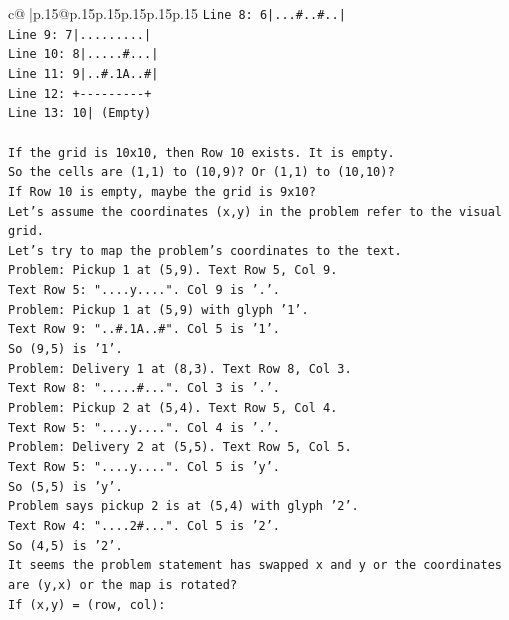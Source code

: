 \documentclass{article}
\begin{document}
{\begin{supertabular}{c@{$\;$}|p{.15\linewidth}@{}p{.15\linewidth}p{.15\linewidth}p{.15\linewidth}p{.15\linewidth}p{.15\linewidth}}
{{{\texttt{Line 8: 6|...\#..\#..|} \\
\texttt{Line 9: 7|.........|} \\
\texttt{Line 10: 8|.....\#...|} \\
\texttt{Line 11: 9|..\#.1A..\#|} \\
\texttt{Line 12: +{-}{-}{-}{-}{-}{-}{-}{-}{-}+} \\
\texttt{Line 13: 10| (Empty)} \\
\\ 
\texttt{If the grid is 10x10, then Row 10 exists. It is empty.} \\
\texttt{So the cells are (1,1) to (10,9)? Or (1,1) to (10,10)?} \\
\texttt{If Row 10 is empty, maybe the grid is 9x10?} \\
\texttt{Let's assume the coordinates (x,y) in the problem refer to the visual grid.} \\
\texttt{Let's try to map the problem's coordinates to the text.} \\
\texttt{Problem: Pickup 1 at (5,9). Text Row 5, Col 9.} \\
\texttt{Text Row 5: "....y....". Col 9 is '.'.} \\
\texttt{Problem: Pickup 1 at (5,9) with glyph '1'.} \\
\texttt{Text Row 9: "..\#.1A..\#". Col 5 is '1'.} \\
\texttt{So (9,5) is '1'.} \\
\texttt{Problem: Delivery 1 at (8,3). Text Row 8, Col 3.} \\
\texttt{Text Row 8: ".....\#...". Col 3 is '.'.} \\
\texttt{Problem: Pickup 2 at (5,4). Text Row 5, Col 4.} \\
\texttt{Text Row 5: "....y....". Col 4 is '.'.} \\
\texttt{Problem: Delivery 2 at (5,5). Text Row 5, Col 5.} \\
\texttt{Text Row 5: "....y....". Col 5 is 'y'.} \\
\texttt{So (5,5) is 'y'.} \\
\texttt{Problem says pickup 2 is at (5,4) with glyph '2'.} \\
\texttt{Text Row 4: "....2\#...". Col 5 is '2'.} \\
\texttt{So (4,5) is '2'.} \\
\texttt{It seems the problem statement has swapped x and y or the coordinates are (y,x) or the map is rotated?} \\
\texttt{If (x,y) = (row, col):} \\
}}}
\end{supertabular}}
\end{document}
